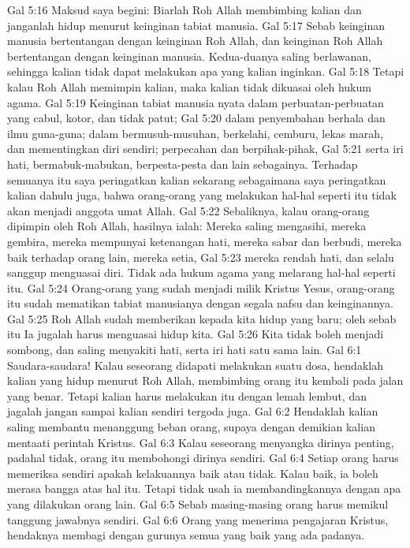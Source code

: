 Gal 5:16  Maksud saya begini: Biarlah Roh Allah membimbing kalian dan janganlah hidup menurut keinginan tabiat manusia.
Gal 5:17  Sebab keinginan manusia bertentangan dengan keinginan Roh Allah, dan keinginan Roh Allah bertentangan dengan keinginan manusia. Kedua-duanya saling berlawanan, sehingga kalian tidak dapat melakukan apa yang kalian inginkan.
Gal 5:18  Tetapi kalau Roh Allah memimpin kalian, maka kalian tidak dikuasai oleh hukum agama.
Gal 5:19  Keinginan tabiat manusia nyata dalam perbuatan-perbuatan yang cabul, kotor, dan tidak patut;
Gal 5:20  dalam penyembahan berhala dan ilmu guna-guna; dalam bermusuh-musuhan, berkelahi, cemburu, lekas marah, dan mementingkan diri sendiri; perpecahan dan berpihak-pihak,
Gal 5:21  serta iri hati, bermabuk-mabukan, berpesta-pesta dan lain sebagainya. Terhadap semuanya itu saya peringatkan kalian sekarang sebagaimana saya peringatkan kalian dahulu juga, bahwa orang-orang yang melakukan hal-hal seperti itu tidak akan menjadi anggota umat Allah.
Gal 5:22  Sebaliknya, kalau orang-orang dipimpin oleh Roh Allah, hasilnya ialah: Mereka saling mengasihi, mereka gembira, mereka mempunyai ketenangan hati, mereka sabar dan berbudi, mereka baik terhadap orang lain, mereka setia,
Gal 5:23  mereka rendah hati, dan selalu sanggup menguasai diri. Tidak ada hukum agama yang melarang hal-hal seperti itu.
Gal 5:24  Orang-orang yang sudah menjadi milik Kristus Yesus, orang-orang itu sudah mematikan tabiat manusianya dengan segala nafsu dan keinginannya.
Gal 5:25  Roh Allah sudah memberikan kepada kita hidup yang baru; oleh sebab itu Ia jugalah harus menguasai hidup kita.
Gal 5:26  Kita tidak boleh menjadi sombong, dan saling menyakiti hati, serta iri hati satu sama lain.
Gal 6:1  Saudara-saudara! Kalau seseorang didapati melakukan suatu dosa, hendaklah kalian yang hidup menurut Roh Allah, membimbing orang itu kembali pada jalan yang benar. Tetapi kalian harus melakukan itu dengan lemah lembut, dan jagalah jangan sampai kalian sendiri tergoda juga.
Gal 6:2  Hendaklah kalian saling membantu menanggung beban orang, supaya dengan demikian kalian mentaati perintah Kristus.
Gal 6:3  Kalau seseorang menyangka dirinya penting, padahal tidak, orang itu membohongi dirinya sendiri.
Gal 6:4  Setiap orang harus memeriksa sendiri apakah kelakuannya baik atau tidak. Kalau baik, ia boleh merasa bangga atas hal itu. Tetapi tidak usah ia membandingkannya dengan apa yang dilakukan orang lain.
Gal 6:5  Sebab masing-masing orang harus memikul tanggung jawabnya sendiri.
Gal 6:6  Orang yang menerima pengajaran Kristus, hendaknya membagi dengan gurunya semua yang baik yang ada padanya.
